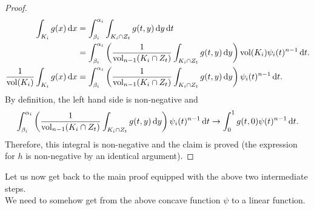 \begin{proof}
\begin{align*}
		\int_{K_i} g(x)\d{x} &= \int_{\beta_i}^{\alpha_i} \int_{K_i\cap Z_t} g(t,y)\d{y}\d{t} \\
			&= \int_{\beta_i}^{\alpha_i} \left( \frac{1}{\vol_{n-1}(K_i\cap Z_t)} \int_{K_i\cap Z_t} g(t,y)\d{y} \right) \vol(K_i) \psi_i(t)^{n-1} \d{t}. \\
		\frac{1}{\vol(K_i)}\int_{K_i} g(x)\d{x} &= \int_{\beta_i}^{\alpha_i} \left( \frac{1}{\vol_{n-1}(K_i\cap Z_t)} \int_{K_i\cap Z_t} g(t,y)\d{y} \right) \psi_i(t)^{n-1} \d{t}.
	\end{align*}
	By definition, the left hand side is non-negative and
	\[ \int_{\beta_i}^{\alpha_i} \left( \frac{1}{\operatorname{vol}_{n-1}(K_i\cap Z_t)} \int_{K_i\cap Z_t} g(t,y)\operatorname{d}\!{y} \right) \psi_i(t)^{n-1} \operatorname{d}\!{t} \to \int_0^1 g(t,0)\psi(t)^{n-1}\operatorname{d}\!{t}. \]
	Therefore, this integral is non-negative and the claim is proved (the expression for $h$ is non-negative by an identical argument).
\end{proof}

Let us now get back to the main proof equipped with the above two intermediate steps.\\
We need to somehow get from the above concave function $\psi$ to a linear function.

